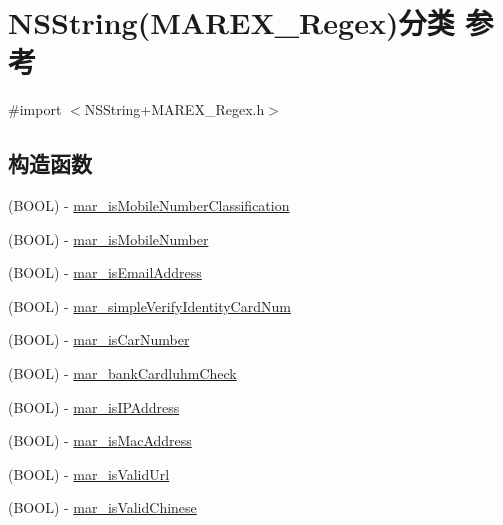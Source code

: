 \hypertarget{category_n_s_string_07_m_a_r_e_x___regex_08}{}\section{N\+S\+String(M\+A\+R\+E\+X\+\_\+\+Regex)分类 参考}
\label{category_n_s_string_07_m_a_r_e_x___regex_08}


{\ttfamily \#import $<$N\+S\+String+\+M\+A\+R\+E\+X\+\_\+\+Regex.\+h$>$}

\subsection*{构造函数}
\begin{DoxyCompactItemize}
\item 
(B\+O\+OL) -\/ \hyperlink{category_n_s_string_07_m_a_r_e_x___regex_08_a30d9fb4bd03eeefb2522fb0e7887364f}{mar\+\_\+is\+Mobile\+Number\+Classification}
\item 
(B\+O\+OL) -\/ \hyperlink{category_n_s_string_07_m_a_r_e_x___regex_08_a38ca5415d6d4ee4943f262a232574de3}{mar\+\_\+is\+Mobile\+Number}
\item 
(B\+O\+OL) -\/ \hyperlink{category_n_s_string_07_m_a_r_e_x___regex_08_afea8124d5d0d5f029f0c645b66e7a13b}{mar\+\_\+is\+Email\+Address}
\item 
(B\+O\+OL) -\/ \hyperlink{category_n_s_string_07_m_a_r_e_x___regex_08_a82eaded6ce24cbdec74c7d30b5d48b8e}{mar\+\_\+simple\+Verify\+Identity\+Card\+Num}
\item 
(B\+O\+OL) -\/ \hyperlink{category_n_s_string_07_m_a_r_e_x___regex_08_a2f2b30c6304c5aaa8eb56131e8a18c0c}{mar\+\_\+is\+Car\+Number}
\item 
(B\+O\+OL) -\/ \hyperlink{category_n_s_string_07_m_a_r_e_x___regex_08_aa349064546f6d96a028b392047a4e146}{mar\+\_\+bank\+Cardluhm\+Check}
\item 
(B\+O\+OL) -\/ \hyperlink{category_n_s_string_07_m_a_r_e_x___regex_08_a964bdcf502534b8044a324f3705d7bfc}{mar\+\_\+is\+I\+P\+Address}
\item 
(B\+O\+OL) -\/ \hyperlink{category_n_s_string_07_m_a_r_e_x___regex_08_a526eb28269dd25a40f7b95b8fdbf4d05}{mar\+\_\+is\+Mac\+Address}
\item 
(B\+O\+OL) -\/ \hyperlink{category_n_s_string_07_m_a_r_e_x___regex_08_aebc34621ea4778423edbee0d8e7e7279}{mar\+\_\+is\+Valid\+Url}
\item 
(B\+O\+OL) -\/ \hyperlink{category_n_s_string_07_m_a_r_e_x___regex_08_a86cd0b09c3b885773e47ca3a31b8bafc}{mar\+\_\+is\+Valid\+Chinese}

\end{DoxyCompactItemize}
